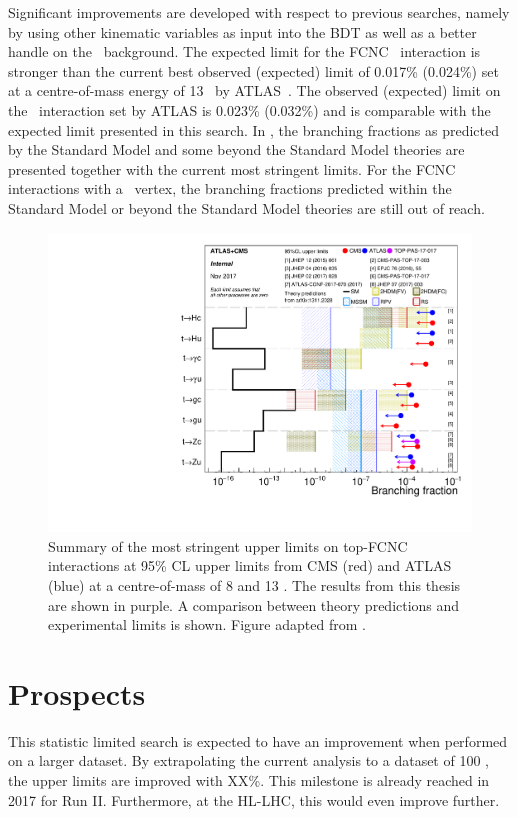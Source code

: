 Significant improvements are developed with respect to previous searches, namely by using other kinematic variables as input into the BDT as well as a better handle on the \NPL\ background.  The expected limit for the FCNC \Zut\ interaction is stronger than the current best observed (expected) limit of 0.017\% (0.024\%) set at a centre-of-mass energy of 13 \TeV\ by ATLAS~\cite{ATLAS-CONF-2017-070}.  The  observed (expected) limit on the \Zct\ interaction set by ATLAS is 0.023\% (0.032\%) and is comparable with the expected limit presented  in this search. In , the branching fractions as predicted by the Standard Model and some beyond the Standard Model theories are presented together with the current most stringent limits. For the FCNC interactions with a \tZq\ vertex, the branching fractions predicted within the Standard Model or beyond the Standard Model theories are still out of reach. 
\begin{figure}[htbp]
	\centering
	\includegraphics[width=0.7\linewidth]{7_Conclusion/Figures/fcnc_upperlimits.pdf}
	\caption{Summary of the most stringent upper limits on top-FCNC interactions at 95\% CL upper limits from CMS (red) and ATLAS (blue) at a centre-of-mass of 8 and 13 \TeV. The results from this thesis are shown in purple. A comparison between theory predictions and experimental limits is shown. Figure adapted from \cite{summarywiki}.}
	\label{fig:fcncupperlimitss}
\end{figure}


\clearpage
\section{Prospects}
This statistic limited search is expected to have an improvement when performed on a larger dataset. By extrapolating the current analysis to a dataset of 100 \fbinv {}, the upper limits are improved with XX\%. This milestone is already reached in 2017 for Run II. Furthermore, at the HL-LHC, this would even improve further. 

